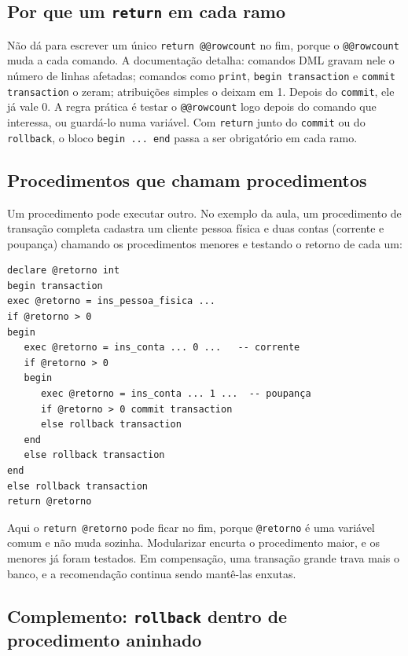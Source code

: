 \subsection{Por que um \texttt{return} em cada ramo}

Não dá para escrever um único \texttt{return @@rowcount} no fim, porque
o \texttt{@@rowcount} muda a cada comando. A documentação
detalha: comandos DML gravam nele o número de linhas afetadas; comandos
como \texttt{print}, \texttt{begin transaction} e \texttt{commit
transaction} o zeram; atribuições simples o deixam em 1. Depois do
\texttt{commit}, ele já vale 0. A regra prática é testar o
\texttt{@@rowcount} logo depois do comando que interessa, ou guardá-lo
numa variável. Com \texttt{return} junto do \texttt{commit} ou do
\texttt{rollback}, o bloco \texttt{begin ... end} passa a ser
obrigatório em cada ramo.

\subsection{Procedimentos que chamam procedimentos}

Um procedimento pode executar outro. No exemplo da aula, um
procedimento de transação completa cadastra um cliente pessoa física e
duas contas (corrente e poupança) chamando os procedimentos menores e
testando o retorno de cada um:

\begin{lstlisting}
declare @retorno int
begin transaction
exec @retorno = ins_pessoa_fisica ...
if @retorno > 0
begin
   exec @retorno = ins_conta ... 0 ...   -- corrente
   if @retorno > 0
   begin
      exec @retorno = ins_conta ... 1 ...  -- poupança
      if @retorno > 0 commit transaction
      else rollback transaction
   end
   else rollback transaction
end
else rollback transaction
return @retorno
\end{lstlisting}

Aqui o \texttt{return @retorno} pode ficar no fim, porque
\texttt{@retorno} é uma variável comum e não muda sozinha. Modularizar
encurta o procedimento maior, e os menores já foram testados. Em
compensação, uma transação grande trava mais o banco, e a recomendação
continua sendo mantê-las enxutas.

\subsection*{Complemento: \texttt{rollback} dentro de procedimento aninhado}

